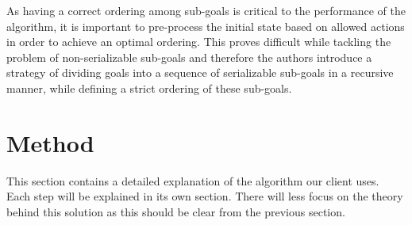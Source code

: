 \documentclass[letterpaper]{article}
\begin{document}
As having a correct ordering among sub-goals is critical to the performance of the algorithm, it is important to pre-process the initial state based on allowed actions in order to achieve an optimal ordering. This proves difficult while tackling the problem of non-serializable sub-goals and therefore the authors introduce a strategy of dividing goals into a sequence of serializable sub-goals in a recursive manner, while defining a strict ordering of these sub-goals.



\section{Method}
This section contains a detailed explanation of the algorithm our client uses. Each step will be explained in its own section. There will less focus on the theory behind this solution as this should be clear from the previous section.
\end{document}
